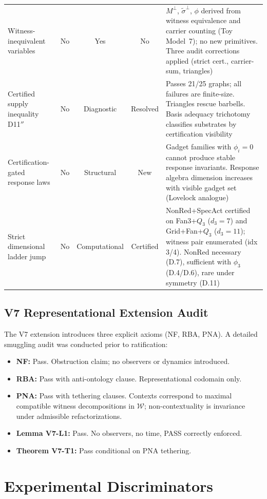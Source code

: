 \documentclass[11pt,a4paper]{article}
\theoremstyle{definition}
\theoremstyle{remark}
\begin{document}
\begin{center}
\begin{tabular}{lcccp{4.5cm}}
Witness-inequivalent variables & No & Yes & No & $M^\perp$, $\tilde\sigma^\perp$, $\phi$ derived from witness equivalence and carrier counting (Toy Model~7); no new primitives. Three audit corrections applied (strict cert., carrier-sum, triangles) \\
Certified supply inequality D11$''$ & No & Diagnostic & Resolved & Passes 21/25 graphs; all failures are finite-size. Triangles rescue barbells. Basis adequacy trichotomy classifies substrates by certification visibility \\
Certification-gated response laws & No & Structural & New & Gadget families with $\phi_i = 0$ cannot produce stable response invariants. Response algebra dimension increases with visible gadget set (Lovelock analogue) \\
Strict dimensional ladder jump & No & Computational & Certified & NonRed+SpecAct certified on Fan3+$Q_3$ ($d_3\!=\!7$) and Grid+Fan+$Q_3$ ($d_3\!=\!11$); witness pair enumerated (idx 3/4). NonRed necessary (D.7), sufficient with $\phi_3$ (D.4/D.6), rare under symmetry (D.11) \\
\bottomrule
\end{tabular}
\end{center}

\subsection{V7 Representational Extension Audit}

The V7 extension introduces three explicit axioms (NF, RBA, PNA). A detailed smuggling audit was conducted prior to ratification:
\begin{itemize}[nosep]
  \item \textbf{NF:} Pass. Obstruction claim; no observers or dynamics introduced.
  \item \textbf{RBA:} Pass with anti-ontology clause. Representational codomain only.
  \item \textbf{PNA:} Pass with tethering clauses. Contexts correspond to maximal compatible witness decompositions in $\mathcal{W}$; non-contextuality is invariance under admissible refactorizations.
  \item \textbf{Lemma V7-L1:} Pass. No observers, no time, PASS correctly enforced.
  \item \textbf{Theorem V7-T1:} Pass conditional on PNA tethering.
\end{itemize}


\section{Experimental Discriminators}\label{app:predict}
\end{document}
